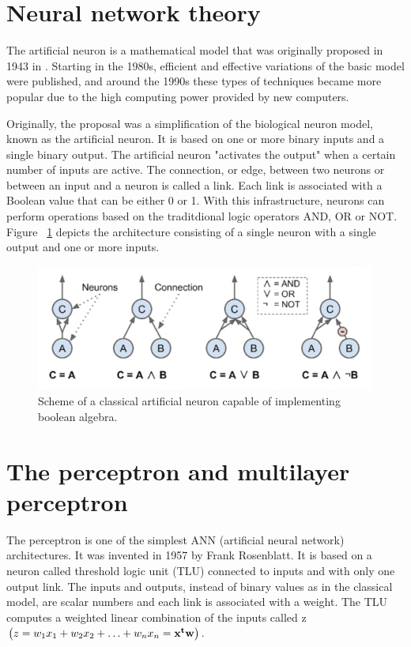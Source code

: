 \section{Neural network theory}
The artificial neuron is a mathematical model that was originally proposed in 1943 in \citeauthor{McCulloch1943} \autocite{McCulloch1943}.
Starting in the 1980s, efficient and effective variations of the basic model were published, and around the 1990s these types of techniques became more popular due to the high computing power provided by new computers.

Originally, the proposal was a simplification of the biological neuron model, known as the artificial neuron. It is based on one or more binary inputs and a single binary output. The artificial neuron "activates the output" when a certain number of inputs are active. The connection, or edge, between two neurons or between an input and a neuron is called a link. Each link is associated with a Boolean value that can be either 0 or 1. With this infrastructure, neurons can perform operations based on the traditdional logic operators AND, OR or NOT.
Figure ~\ref{fig:neuronsBasic} depicts the architecture consisting of a single neuron with a single output and one or more inputs.

\begin{figure} [h]
    \centering
    \includegraphics [width=\textwidth,height=\textheight,keepaspectratio] {Images/Theory_and_method/unnamed.png}
    \caption{ Scheme of a classical artificial neuron capable of implementing boolean algebra.}
    \label{fig:neuronsBasic}
\end{figure}

\clearpage

\section{The perceptron and multilayer perceptron} \label{percy}
The perceptron is one of the simplest ANN (artificial neural network) architectures. It was invented in 1957 by Frank Rosenblatt. It is based on a neuron called threshold logic unit (TLU) connected to inputs and with only one output link. The inputs and outputs, instead of binary values as in the classical model, are scalar numbers and each link is associated with a weight. The TLU computes a weighted linear combination of the inputs called z $\left(z=w_{1} x_{1}+w_{2} x_{2}+\ldots+w_{n} x_{n}= {\bf x^{t} w}\right)$.

